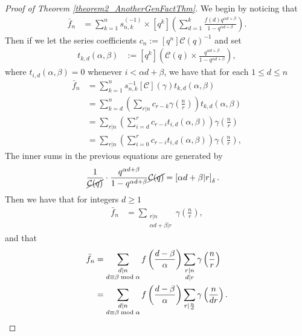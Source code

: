 \documentclass[12pt,reqno,a4letter]{article}
\numberwithin{figure}{section}
\numberwithin{table}{section}
\numberwithin{equation}{section}
\newcommand{\Iverson}[1]{\ensuremath{\left[#1\right]_{\delta}}}
\theoremstyle{plain}
\numberwithin{theorem}{section}
\theoremstyle{definition}
\begin{document}
\begin{proof}[Proof of Theorem \ref{theorem2_AnotherGenFactThm}] 
We begin by noticing that 
\begin{align*} 
\bar{f}_n & = \sum_{k=1}^n s_{n,k}^{(-1)} \times [q^k] \left(\sum_{d=1}^k 
     \frac{f(d) q^{\alpha d+\beta}}{1-q^{\alpha d+\beta}}\right). 
\end{align*} 
Then if we let the series coefficients $c_n := [q^n] \mathcal{C}(q)^{-1}$ and set 
\begin{align*} 
t_{k,d}(\alpha, \beta) & := [q^k]\left(\mathcal{C}(q) \times 
     \frac{q^{\alpha d+\beta}}{1-q^{\alpha d+\beta}}\right), 
\end{align*} 
where $t_{i,d}(\alpha, \beta) = 0$ whenever $i < \alpha d+\beta$, 
we have that for each $1 \leq d \leq n$ 
\begin{align*}
[a_d] \bar{f}_n & = \sum_{k=1}^n s_{n,k}^{-1}[\mathcal{C}](\gamma) t_{k,d}(\alpha, \beta) \\ 
     & = 
     \sum_{k=d}^n \left(\sum_{r|n} c_{r-k} \gamma\left(\frac{n}{r}\right)\right) t_{k,d}(\alpha, \beta) \\ 
     & = 
     \sum_{r|n} \left(\sum_{i=d}^r c_{r-i} t_{i,d}(\alpha, \beta)\right) \gamma\left(\frac{n}{r}\right) \\ 
     & = 
     \sum_{r|n} \left(\sum_{i=0}^r c_{r-i} t_{i,d}(\alpha, \beta)\right) \gamma\left(\frac{n}{r}\right), 
\end{align*} 
The inner sums in the previous equations are generated by 
\begin{align*} 
[q^r] \frac{1}{\cancel{\mathcal{C}(q)}} \cdot 
     \frac{q^{\alpha d+\beta}}{1-q^{\alpha d+\beta}} \cancel{\mathcal{C}(q)} & = 
     \Iverson{\alpha d+\beta | r}. 
\end{align*} 
Then we have that for integers $d \geq 1$ 
\begin{align*} 
[f(d)] \bar{f}_n & = \sum_{\substack{r|n \\ \alpha d + \beta | r}} \gamma\left(\frac{n}{r}\right), 
\end{align*} 
and that 
\begin{align*} 
\bar{f}_n & = \sum_{\substack{d|n \\ d \equiv \beta \bmod \alpha}} f\left({\frac{d-\beta}{\alpha}}\right)
     \sum_{\substack{r|n \\ d | r}} \gamma\left(\frac{n}{r}\right) \\ 
     & = 
\sum_{\substack{d|n \\ d \equiv \beta \bmod \alpha}} f\left({\frac{d-\beta}{\alpha}}\right) 
     \sum_{r | \frac{n}{d}} \gamma\left(\frac{n}{dr}\right). 
     \qedhere
\end{align*} 
\end{proof} 
\end{document}
